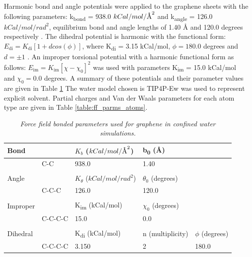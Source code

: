\documentclass[12pt]{article}
\newcommand{\angstrom}{\textup{\AA}}
\begin{document}
Harmonic bond and angle potentials were applied to the graphene sheets with 
the following parameters: k\textsubscript{bond} = 938.0 \(kCal/mol/\angstrom^2\)
and k\textsubscript{angle} = 126.0 \(kCal/mol/rad^2\), equilibrium bond and 
angle lengths of 1.40 \r A and 120.0 degrees respectively \cite{Hummer2001}. The
dihedral potential is harmonic with the functional form: \(E_{\text{di}} = K_{\text{di}} [ 1 + d cos(\phi)]\),
where K\textsubscript{di} = 3.15 kCal/mol, \(\phi = 180.0\) degrees and \(d = \pm 1\) \cite{Patra2009}. An improper torsional 
potential with a harmonic functional form as follows: \( E_{\text{im}} = K_{\text{im}} [ \chi - \chi_0 ]^2\) was
used with parameters K\textsubscript{im} =  15.0 kCal/mol and \(\chi_0 = 0.0\) degrees. A summary
of these potentials and their parameter values are given in Table \ref{table:ff_parms}
The water model chosen is TIP4P-Ew \cite{Horn2004} was used 
to represent explicit solvent. Partial charges and Van der Waals parameters for each atom type 
are given in Table \ref{table:ff_parms_atoms}.

\begin{table}[ht!]
\centering
\begin{tabular}{ lllll } \hline
Bond     &         & \(K_b\)  (\(kCal/mol/\angstrom^2\))      & b\textsubscript{0}  (\r A)            &          \\ \hline
         & C-C     & 938.0         & 1.40            &          \\
         &         &               &                 &          \\ \hline
Angle    &         & \(K_{\theta}\)  (\(kCal/mol/rad^2\)) & \(\theta_0\) (degrees)   &          \\ \hline
         & C-C-C   & 126.0         & 120.0           &          \\
                           &         &               &                 &          \\ \hline
Improper &         & K\textsubscript{im} (kCal/mol)       & \(\chi_0\) (degrees)     &          \\ \hline
         & C-C-C-C & 15.0          & 0.0             &          \\
                           &         &               &                 &          \\ \hline
Dihedral &         & K\textsubscript{di} (kCal/mol)       & n (multiplicity) & \(\phi\) (degrees)\\ \hline
         & C-C-C-C & 3.150         & 2               & 180.0  \\ 
\end{tabular}
\caption{\textit{Force field bonded parameters used for graphene in confined water simulations.}}
\label{table:ff_parms}
\end{table}
\end{document}
